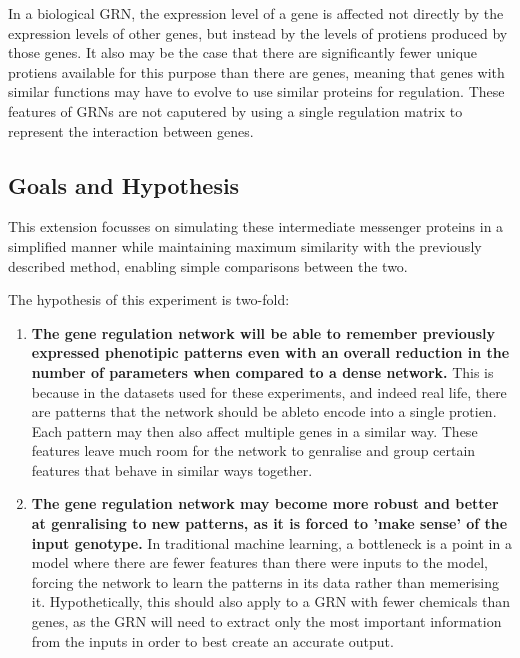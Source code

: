 \documentclass[twocolumn,a4paper]{article}
\begin{document}
    In a biological GRN, the expression level of a gene is affected not directly by the expression levels of other genes, but instead by the levels of protiens produced by those genes. It also may be the case that there are significantly fewer unique protiens available for this purpose than there are genes, meaning that genes with similar functions may have to evolve to use similar proteins for regulation. These features of GRNs are not caputered by using a single regulation matrix to represent the interaction between genes.

    \subsection{Goals and Hypothesis}
    This extension focusses on simulating these intermediate messenger proteins in a simplified manner while maintaining maximum similarity with the previously described method, enabling simple comparisons between the two.

    The hypothesis of this experiment is two-fold:
    \begin{enumerate}
        \item \textbf{The gene regulation network will be able to remember previously expressed phenotipic patterns even with an overall reduction in the number of parameters when compared to a dense network.} This is because in the datasets used for these experiments, and indeed real life, there are patterns that the network should be ableto encode into a single protien. Each pattern may then also affect multiple genes in a similar way. These features leave much room for the network to genralise and group certain features that behave in similar ways together.
        \item \textbf{The gene regulation network may become more robust and better at genralising to new patterns, as it is forced to 'make sense' of the input genotype.} In traditional machine learning, a bottleneck is a point in a model where there are fewer features than there were inputs to the model, forcing the network to learn the patterns in its data rather than memerising it. Hypothetically, this should also apply to a GRN with fewer chemicals than genes, as the GRN will need to extract only the most important information from the inputs in order to best create an accurate output.
    \end{enumerate}
\end{document}
